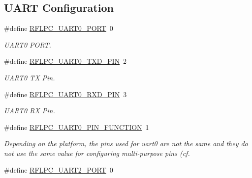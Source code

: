 \subsection*{U\-A\-R\-T Configuration}
\begin{DoxyCompactItemize}
\item 
\hypertarget{group__config_ga5cdbffcf41fc063af9cfcb1473c80332}{\#define \hyperlink{group__config_ga5cdbffcf41fc063af9cfcb1473c80332}{R\-F\-L\-P\-C\-\_\-\-U\-A\-R\-T0\-\_\-\-P\-O\-R\-T}~0}\label{group__config_ga5cdbffcf41fc063af9cfcb1473c80332}

\begin{DoxyCompactList}\small\item\em U\-A\-R\-T0 P\-O\-R\-T. \end{DoxyCompactList}\item 
\hypertarget{group__config_gadf8bc56f69f4501e5960ea79ed4f300d}{\#define \hyperlink{group__config_gadf8bc56f69f4501e5960ea79ed4f300d}{R\-F\-L\-P\-C\-\_\-\-U\-A\-R\-T0\-\_\-\-T\-X\-D\-\_\-\-P\-I\-N}~2}\label{group__config_gadf8bc56f69f4501e5960ea79ed4f300d}

\begin{DoxyCompactList}\small\item\em U\-A\-R\-T0 T\-X Pin. \end{DoxyCompactList}\item 
\hypertarget{group__config_ga752305019118b083adfaa2b341912ee4}{\#define \hyperlink{group__config_ga752305019118b083adfaa2b341912ee4}{R\-F\-L\-P\-C\-\_\-\-U\-A\-R\-T0\-\_\-\-R\-X\-D\-\_\-\-P\-I\-N}~3}\label{group__config_ga752305019118b083adfaa2b341912ee4}

\begin{DoxyCompactList}\small\item\em U\-A\-R\-T0 R\-X Pin. \end{DoxyCompactList}\item 
\#define \hyperlink{group__config_ga16df9509883b14d96ddf30f831a0fae5}{R\-F\-L\-P\-C\-\_\-\-U\-A\-R\-T0\-\_\-\-P\-I\-N\-\_\-\-F\-U\-N\-C\-T\-I\-O\-N}~1
\begin{DoxyCompactList}\small\item\em Depending on the platform, the pins used for uart0 are not the same and they do not use the same value for configuring multi-\/purpose pins (cf. \end{DoxyCompactList}\item 
\hypertarget{group__config_gad108f2b9ae2d6aa85bbc58c2e98438df}{\#define \hyperlink{group__config_gad108f2b9ae2d6aa85bbc58c2e98438df}{R\-F\-L\-P\-C\-\_\-\-U\-A\-R\-T2\-\_\-\-P\-O\-R\-T}~0}\label{group__config_gad108f2b9ae2d6aa85bbc58c2e98438df}


\end{DoxyCompactItemize}
